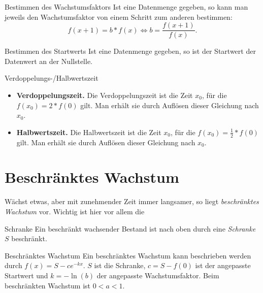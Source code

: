 \begin{bla}{Bestimmen des Wachstumsfaktors}
  Ist eine Datenmenge gegeben, so kann man jeweils den Wachstumsfaktor von einem Schritt zum anderen bestimmen:
  \begin{equation*}
    f(x+1)=b*f(x) \Leftrightarrow b=\frac{f(x+1)}{f(x)}.
  \end{equation*}
\end{bla}

\begin{bla}{Bestimmen des Startwerts}
  Ist eine Datenmenge gegeben, so ist der Startwert der Datenwert an der Nullstelle.
\end{bla}

\begin{bla}{Verdoppelungs-/Halbwertszeit}
  \begin{itemize}
    \item \textbf{Verdoppelungszeit.} Die Verdoppelungszeit ist die Zeit $x_0$, für die $f(x_0)=2*f(0)$ gilt. Man erhält sie durch Auflösen dieser Gleichung nach $x_0$.
    \item \textbf{Halbwertszeit.} Die Halbwertszeit ist die Zeit $x_0$, für die $f(x_0)= \tfrac{1}{2}*f(0)$ gilt. Man erhält sie durch Auflösen dieser Gleichung nach $x_0$.
  \end{itemize}
\end{bla}

\section{Beschränktes Wachstum}

Wächst etwas, aber mit zunehmender Zeit immer langsamer, so liegt \emph{beschränktes Wachstum} vor. Wichtig ist hier vor allem die

\begin{bla}{Schranke}
  Ein beschränkt wachsender Bestand ist nach oben durch eine \emph{Schranke} $S$ beschränkt.
\end{bla}

\begin{bla}{Beschränktes Wachstum}
  Ein beschränktes Wachstum kann beschrieben werden durch $f(x)=S-ce^{-kx}$. $S$ ist die Schranke, $c=S-f(0)$ ist der angepasste Startwert und $k=-\ln(b)$ der angepasste Wachstumsfaktor. Beim beschränkten Wachstum ist $0<a<1$.
\end{bla}

